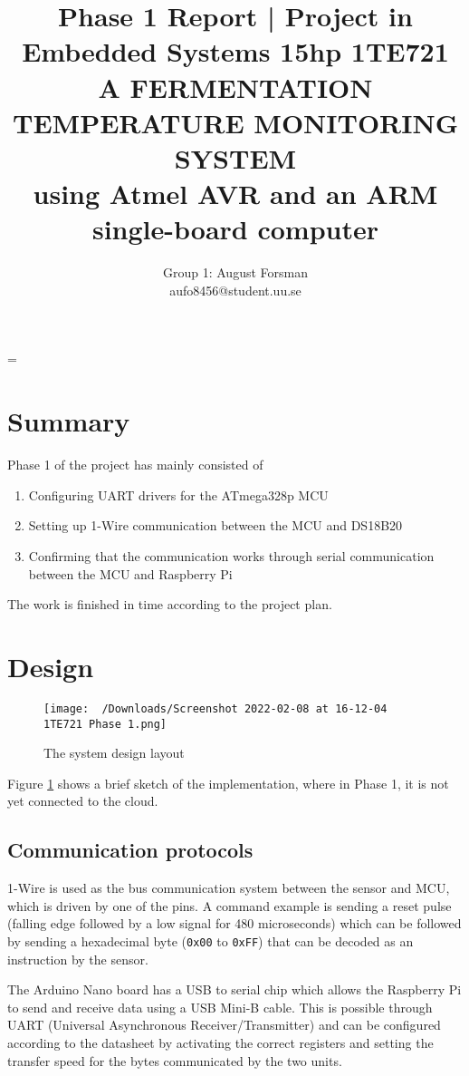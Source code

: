 \documentclass[10pt]{article}
\title{\renewcommand{\baselinestretch}{1.17}\normalsize\bf%
  Phase 1 Report | Project in Embedded Systems 15hp 1TE721\\
  \vspace{2mm}
  \uppercase{A fermentation temperature monitoring system}\\
  using Atmel AVR and an ARM single-board computer\\
}
\author{%
  Group 1: August Forsman\\
  \small aufo8456@student.uu.se
}
\begin{document}
\date{}

\maketitle

\vspace{-0.5cm}

\baselineskip=\normalbaselineskip

\section*{Summary}%
Phase 1 of the project has mainly consisted of
\begin{enumerate}
  \item Configuring UART drivers for the ATmega328p MCU
  \item Setting up 1-Wire communication between the MCU and DS18B20
  \item Confirming that the communication works through serial communication between the MCU and Raspberry Pi
\end{enumerate}
The work is finished in time according to the project plan.
\label{sec:summary}

\section*{Design}%
\label{sec:design}
\begin{figure}[htpb]
  \centering
  \texttt{[image: ~/Downloads/Screenshot 2022-02-08 at 16-12-04 1TE721 Phase 1.png]}
  \caption{The system design layout}%
  \label{fig:p1}
\end{figure}
Figure \ref{fig:p1} shows a brief sketch of the implementation, where in Phase 1, it is not yet connected to the cloud. 

\subsection*{Communication protocols}%
\label{sub:communication_protocols}
1-Wire is used as the bus communication system between the sensor and MCU, which is driven by one of the pins. A command example is sending a reset pulse (falling edge followed by a low signal for 480 microseconds) which can be followed by sending a hexadecimal byte (\verb|0x00| to \verb|0xFF|) that can be decoded as an instruction by the sensor.

The Arduino Nano board has a USB to serial chip which allows the Raspberry Pi to send and receive data using a USB Mini-B cable. This is possible through UART (Universal Asynchronous Receiver/Transmitter) and can be configured according to the datasheet by activating the correct registers and setting the transfer speed for the bytes communicated by the two units.
\end{document}
